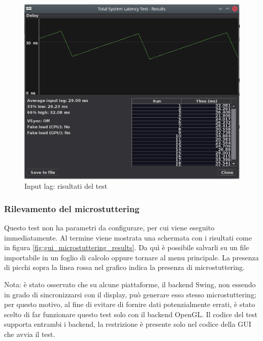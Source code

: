 \begin{figure}[H]
	\centering
	\includegraphics[width=\textwidth]{Applicazione_files/gui_inputlag_results.png}
	\caption{Input lag: risultati del test}
	\label{fig:gui_inputlag_results}
\end{figure}

\subsubsection{Rilevamento del microstuttering}
Questo test non ha parametri da configurare, per cui viene eseguito immediatamente. Al termine viene mostrata una schermata con i risultati come in figura \ref{fig:gui_microstuttering_results}. Da quì è possibile salvarli su un file importabile in un foglio di calcolo oppure tornare al menu principale. La presenza di picchi sopra la linea rossa nel grafico indica la presenza di microstuttering.

Nota: è stato osservato che su alcune piattaforme, il backend Swing, non essendo in grado di sincronizzarsi con il display, può generare esso stesso microstuttering; per questo motivo, al fine di evitare di fornire dati potenzialmente errati, è stato scelto di far funzionare questo test solo con il backend OpenGL. Il codice del test supporta entrambi i backend, la restrizione è presente solo nel codice della GUI che avvia il test.

